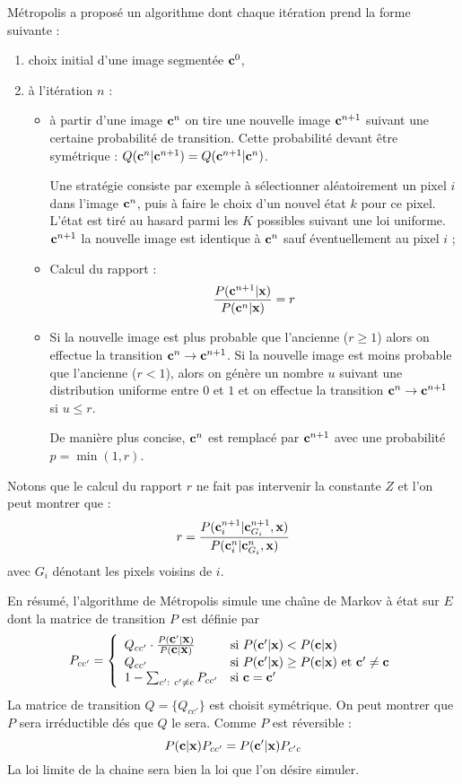 M\'etropolis a propos\'e un algorithme dont chaque it\'eration prend la forme
suivante :
\begin{enumerate}
\item choix initial d'une image segment\'ee $\mbox{\bf c}^0$,
\item \`a l'it\'eration $n$ : 
\begin{itemize}
\item \`a partir d'une image $\mbox{\bf c}^n$ on tire une nouvelle image
$\mbox{\bf c}^{n+1}$ suivant une certaine probabilit\'e de transition.
Cette probabilit\'e devant \^etre sym\'etrique :
$Q(\mbox{\bf c}^n | \mbox{\bf c}^{n+1}) = Q(\mbox{\bf c}^{n+1} | \mbox{\bf c}^n)$.

Une strat\'egie consiste par exemple \`a s\'electionner al\'eatoirement
un pixel $i$ dans l'image $\mbox{\bf c}^n$, puis \`a faire le 
choix d'un nouvel \'etat $k$ pour ce pixel. L'\'etat
est tir\'e au hasard parmi les $K$ possibles suivant une loi
uniforme. $\mbox{\bf c}^{n+1}$ la nouvelle image est  identique \`a $\mbox{\bf c}^n$
sauf \'eventuellement au pixel $i$ ;

\item Calcul du rapport :
$$
\frac{P(\mbox{\bf c}^{n+1} | \mbox{\bf x})}{P(\mbox{\bf c}^{n} | \mbox{\bf x})}=r
$$ 

\item Si la nouvelle image est plus probable que l'ancienne ($r \geq 1$)
alors on effectue la transition $\mbox{\bf c}^n \rightarrow \mbox{\bf c}^{n+1}$. Si la nouvelle
image est moins probable que l'ancienne ($r<1$), alors on g\'en\`ere 
un nombre $u$ suivant une distribution uniforme entre $0$ et $1$ et 
on effectue la transition $\mbox{\bf c}^n \rightarrow \mbox{\bf c}^{n+1}$ si $u \leq r$.

De mani\`ere plus concise, $\mbox{\bf c}^n$ est remplac\'e par $\mbox{\bf c}^{n+1}$ avec
une probabilit\'e $p=\min(1,r)$.   
\end{itemize}
\end{enumerate}
Notons que le calcul du rapport $r$ ne fait pas intervenir la constante $Z$
et l'on peut montrer \cite{Besag1974} que :
$$
r=\frac{P(\mbox{\bf c}_i^{n+1} | \mbox{\bf c}_{G_i}^{n+1}, \mbox{\bf x} )}{P(\mbox{\bf c}_i^{n} | \mbox{\bf c}_{G_i}^{n}, \mbox{\bf x} )}
$$
avec ${G_i}$ d\'enotant les pixels voisins de $i$. 

En r\'esum\'e, l'algorithme de M\'etropolis simule une cha\^{\i}ne de Markov \`a
\'etat sur $E$ dont la matrice  de  transition $P$ est d\'efinie par
$$
P_{cc'}=
\left \{
\begin{array}{l l}
Q_{cc'} \cdot \frac{P(\mbox{\bf c}'|  \mbox{\bf x})}{P(\mbox{\bf c} |  \mbox{\bf x})} & \mbox{si $P(\mbox{\bf c}' | \mbox{\bf x}) < P(\mbox{\bf c} | \mbox{\bf x}) $}\\
Q_{cc'} & \mbox{si $P(\mbox{\bf c}' | \mbox{\bf x}) \geq P(\mbox{\bf c} | \mbox{\bf x}) $ et $\mbox{\bf c}' \neq \mbox{\bf c}$}\\
1-\sum_{c' : \ c'\neq c }P_{cc'} & \mbox{si $\mbox{\bf c}=\mbox{\bf c}'$} 
\end{array}
\right .  
$$ 
La matrice de transition $Q=\{Q_{cc'}\}$ est choisit sym\'etrique.
On peut montrer que $P$ sera irr\'eductible d\'es que $Q$ le sera.
Comme $P$ est r\'eversible :
$$
P(\mbox{\bf c} | \mbox{\bf x} ) P_{cc'}= P(\mbox{\bf c}' | \mbox{\bf x}) P_{c'c}   
$$
La loi limite de la chaine sera bien la loi que l'on d\'esire simuler.



